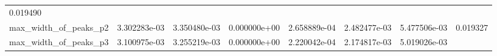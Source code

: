 \documentclass[11pt]{article}
\begin{document}
\begin{longtable}[]{@{}llllllll@{}}
\begin{minipage}[t]{0.08\columnwidth}
0.019490\strut
\end{minipage}\tabularnewline
\begin{minipage}[t]{0.16\columnwidth}\raggedright
max\_width\_of\_peaks\_p2\strut
\end{minipage} & \begin{minipage}[t]{0.09\columnwidth}\raggedright
3.302283e-03\strut
\end{minipage} & \begin{minipage}[t]{0.09\columnwidth}\raggedright
3.350480e-03\strut
\end{minipage} & \begin{minipage}[t]{0.09\columnwidth}\raggedright
0.000000e+00\strut
\end{minipage} & \begin{minipage}[t]{0.09\columnwidth}\raggedright
2.658889e-04\strut
\end{minipage} & \begin{minipage}[t]{0.09\columnwidth}\raggedright
2.482477e-03\strut
\end{minipage} & \begin{minipage}[t]{0.09\columnwidth}\raggedright
5.477506e-03\strut
\end{minipage} & \begin{minipage}[t]{0.08\columnwidth}\raggedright
0.019327\strut
\end{minipage}\tabularnewline
\begin{minipage}[t]{0.16\columnwidth}\raggedright
max\_width\_of\_peaks\_p3\strut
\end{minipage} & \begin{minipage}[t]{0.09\columnwidth}\raggedright
3.100975e-03\strut
\end{minipage} & \begin{minipage}[t]{0.09\columnwidth}\raggedright
3.255219e-03\strut
\end{minipage} & \begin{minipage}[t]{0.09\columnwidth}\raggedright
0.000000e+00\strut
\end{minipage} & \begin{minipage}[t]{0.09\columnwidth}\raggedright
2.220042e-04\strut
\end{minipage} & \begin{minipage}[t]{0.09\columnwidth}\raggedright
2.174817e-03\strut
\end{minipage} & \begin{minipage}[t]{0.09\columnwidth}\raggedright
5.019026e-03\strut
\end{minipage} & \begin{minipage}[t]{0.08\columnwidth}\raggedright

\end{minipage}
\end{longtable}
\end{document}
